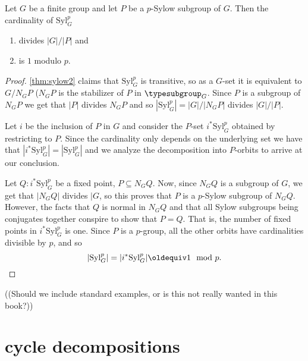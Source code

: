 \begin{theorem}
  \label{thm:sylow3}
  Let $G$ be a finite group and let $P$ be a $p$-Sylow subgroup of $G$.  Then the cardinality of $\mathrm{Syl}_G^p$
  \begin{enumerate}
  \item divides $|G|/|P|$ and
  \item is $1$ modulo $p$.
  \end{enumerate}
\end{theorem}
\begin{proof}
  \cref{thm:sylow2} claims that $\mathrm{Syl}_G^p$ is transitive, so as a $G$-set it is equivalent to $G/N_GP$ ($N_GP$ is the stabilizer of $P$ in $\typesubgroup_G$.  Since $P$ is a subgroup of $N_GP$ we get that $|P|$ divides $N_GP$ and so $|\mathrm{Syl}_G^p|=|G|/|N_GP|$ divides $|G|/|P|$.

  Let $i$ be the inclusion of $P$ in $G$ and consider the $P$-set $i^*\mathrm{Syl}_G^p$ obtained by restricting to $P$.  Since the cardinality only depends on the underlying set we have that $|i^*\mathrm{Syl}_G^p|=|\mathrm{Syl}_G^p|$ and we analyze the decomposition into $P$-orbits to arrive at our conclusion.

  Let $Q:i^*\mathrm{Syl}_G^p$ be a fixed point, \ie $P\subseteq N_GQ$.  Now, since $N_GQ$ is a subgroup of $G$, we get that $|N_GQ|$ divides $|G$, so this proves that $P$ is a $p$-Sylow subgroup of $N_GQ$.  However, the facts that $Q$ is normal in $N_GQ$ and that all Sylow subgroups being conjugates together conspire to show that $P=Q$.  That is, the number of fixed points in $i^*\mathrm{Syl}_G^p$ is one.  Since $P$ is a $p$-group, all the other orbits have cardinalities divisible by $p$, and so
  $$|\mathrm{Syl}_G^p|=|i^*\mathrm{Syl}_G^p|\oldequiv 1\mod p.$$
\end{proof}

((Should we include standard examples, or is this not really wanted in this book?))

\section{cycle decompositions}

